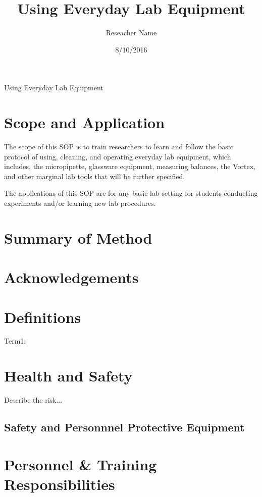 \documentclass[12pt]{../SOP3_beta}\usepackage[]{graphicx}\usepackage[]{color}
\title{Using Everyday Lab Equipment }
\date{8/10/2016}
\author{Reseacher Name}
\begin{document}

\maketitle 
Using Everyday Lab Equipment 

\section{Scope and Application}

\NP The scope of this SOP is  to train researchers to learn and follow the basic protocol of using, cleaning, and operating everyday lab equipment, which includes, the micropipette, glassware equipment, measuring balances, the Vortex, and other marginal lab tools that will be further specified. 

\NP The applications of this SOP are for any basic lab setting for students conducting experiments and/or learning new lab procedures.

\section{Summary of Method}

\NP 

\tableofcontents

\newpage

\section{Acknowledgements}

\section{Definitions}

\NP Term1:


\section{Health and Safety}

\NP Describe the risk...


\subsection*{Safety and Personnnel Protective Equipment}


\section{Personnel \& Training Responsibilities}
\end{document}
